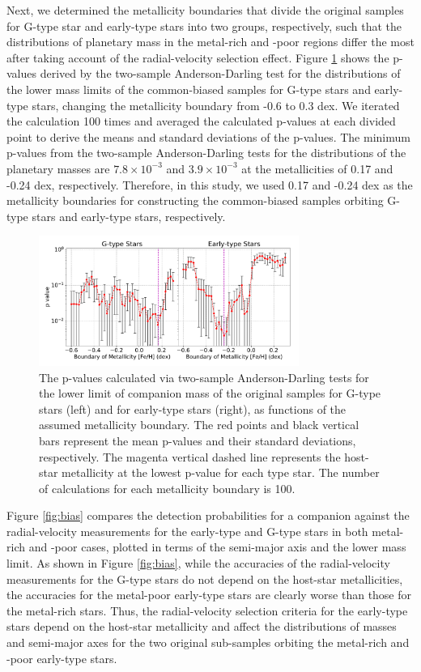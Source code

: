 \documentclass[twocolumn]{aastex62}
\begin{document}
\begin{CJK*}{UTF8}{min}
Next, we determined the metallicity boundaries that divide the original samples for G-type star and early-type stars into two groups, respectively, such that the distributions of planetary mass in the metal-rich and -poor regions differ the most after taking account of the radial-velocity selection effect. Figure \ref{fig:pvalue} shows the p-values derived by the two-sample Anderson-Darling test for the distributions of the lower mass limits of the common-biased samples for G-type stars and early-type stars, changing the metallicity boundary from -0.6 to 0.3 dex. We iterated the calculation 100 times and averaged the calculated p-values at each divided point to derive the means and standard deviations of the p-values. The minimum p-values from the two-sample Anderson-Darling tests for the distributions of the planetary masses are $7.8\times10^{-3}$ and $3.9\times10^{-3}$ at the metallicities of 0.17 and -0.24 dex, respectively. Therefore, in this study, we used 0.17 and -0.24 dex as the metallicity boundaries for constructing the common-biased samples orbiting G-type stars and early-type stars, respectively.

\begin{figure}[t]
\centering
\includegraphics[width=8.5cm]{metal_boundary.pdf}
\caption{The p-values calculated via two-sample Anderson-Darling tests for the lower limit of companion mass of the original samples for G-type stars (left) and for early-type stars (right), as functions of the assumed metallicity boundary. The red points and black vertical bars represent the mean p-values and their standard deviations, respectively. The magenta vertical dashed line represents the host-star metallicity at the lowest p-value for each type star. The number of calculations for each metallicity boundary is 100.}
\label{fig:pvalue}
\end{figure}

Figure \ref{fig:bias} compares the detection probabilities for a companion against the radial-velocity measurements for the early-type and G-type stars in both metal-rich and -poor cases, plotted in terms of the semi-major axis and the lower mass limit. As shown in Figure \ref{fig:bias}, while the accuracies of the radial-velocity measurements for the G-type stars do not depend on the host-star metallicities, the accuracies for the metal-poor early-type stars are clearly worse than those for the metal-rich stars. Thus, the radial-velocity selection criteria for the early-type stars depend on the host-star metallicity and affect the distributions of masses and semi-major axes for the two original sub-samples orbiting the metal-rich and -poor early-type stars. 


\end{CJK*}
\end{document}
